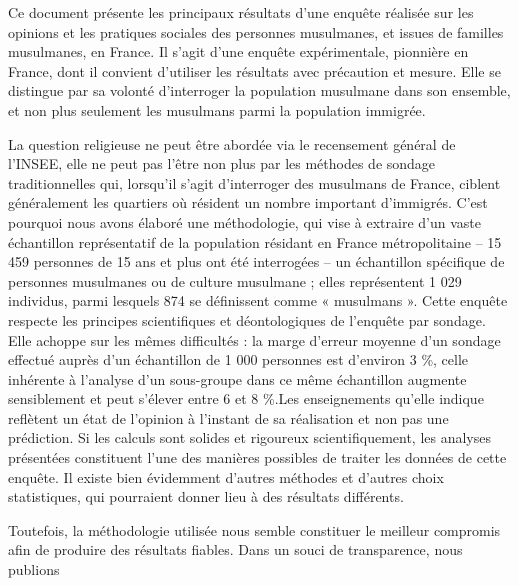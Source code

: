 Ce document présente les principaux résultats d'une enquête réalisée
sur les opinions et les pratiques sociales des personnes musulmanes, et
issues de familles musulmanes, en France. Il s'agit d'une enquête
expérimentale, pionnière en France, dont il convient d'utiliser les
résultats avec précaution et mesure. Elle se distingue par sa volonté
d'interroger la population musulmane dans son ensemble, et non plus
seulement les musulmans parmi la population immigrée.

La question religieuse ne peut être abordée via le recensement général
de l'INSEE, elle ne peut pas l'être non plus par les méthodes de sondage
traditionnelles qui, lorsqu'il s'agit d'interroger des musulmans de
France, ciblent généralement les quartiers où résident un nombre
important d'immigrés. C'est pourquoi nous avons élaboré une
méthodologie, qui vise à extraire d'un vaste échantillon représentatif
de la population résidant en France métropolitaine -- 15 459 personnes
de 15 ans et plus ont été interrogées -- un échantillon spécifique de
personnes musulmanes ou de culture musulmane ; elles représentent 1 029
individus, parmi lesquels 874 se définissent comme « musulmans ». Cette
enquête respecte les principes scientifiques et déontologiques de
l'enquête par sondage. Elle achoppe sur les mêmes difficultés : la marge
d'erreur moyenne d'un sondage effectué auprès d'un échantillon de 1 000
personnes est d'environ 3 \%, celle inhérente à l'analyse d'un
sous-groupe dans ce même échantillon augmente sensiblement et peut
s'élever entre 6 et 8 \%.Les enseignements qu'elle indique reflètent un
état de l'opinion à l'instant de sa réalisation et non pas une
prédiction. Si les calculs sont solides et rigoureux scientifiquement,
les analyses présentées constituent l'une des manières possibles de
traiter les données de cette enquête. Il existe bien évidemment d'autres
méthodes et d'autres choix statistiques, qui pourraient donner lieu à
des résultats différents.

Toutefois, la méthodologie utilisée nous semble constituer le meilleur
compromis afin de produire des résultats fiables. Dans un souci de
transparence, nous publions

